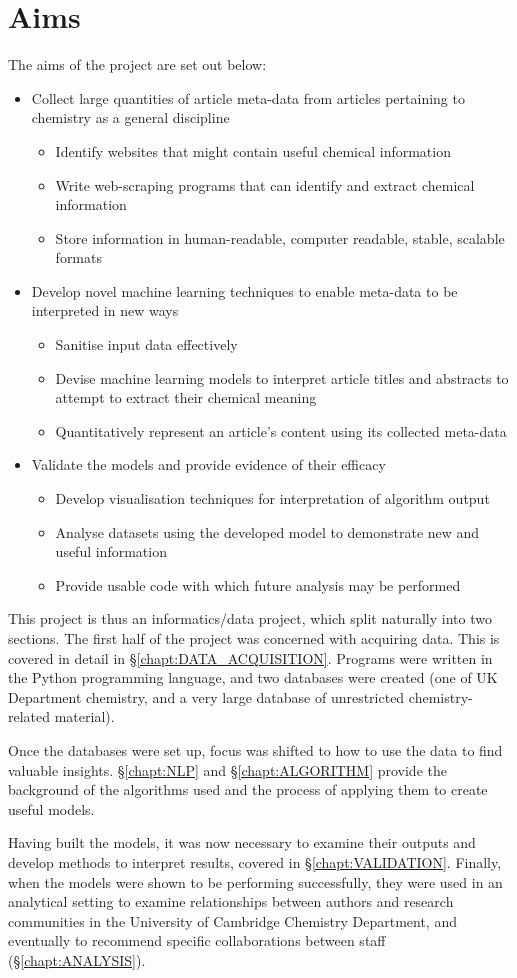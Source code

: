 \section{Aims}
The aims of the project are set out below:
\begin{itemize}
\item Collect large quantities of article meta-data from articles pertaining to chemistry as a general discipline
\begin{itemize}
\item Identify websites that might contain useful chemical information
\item Write web-scraping programs that can identify and extract chemical information
\item Store information in human-readable, computer readable, stable, scalable formats
\end{itemize}
\item Develop novel machine learning techniques to enable meta-data to be interpreted in new ways
\begin{itemize}
\itemsep0em 
\item Sanitise input data effectively
\item Devise  machine learning models to interpret article titles and abstracts to attempt to extract their chemical meaning
\item Quantitatively represent an article's content using its collected meta-data
\end{itemize}
\item Validate the models and provide evidence of their efficacy
\begin{itemize}
\item Develop visualisation techniques for interpretation of algorithm output
\item Analyse datasets using the developed model to demonstrate new and useful information
\item Provide usable code with which future analysis may be performed
\end{itemize}
\end{itemize}
This project is thus an informatics/data project, which split naturally into two sections. The first half of the project was concerned with acquiring data. This is covered in detail in \S\ref{chapt:DATA_ACQUISITION}.
Programs were written in the Python programming language, and two databases were created (one of UK Department chemistry, and a very large database of unrestricted chemistry-related material).

Once the databases were set up, focus was shifted to how to use the data to find valuable insights. \S\ref{chapt:NLP} and \S\ref{chapt:ALGORITHM} provide the background of the algorithms used and the process of applying them to create useful models. 

Having built the models, it was now necessary to examine their outputs and develop methods to interpret results, covered in \S\ref{chapt:VALIDATION}. Finally, when the models were shown to be performing successfully, they were used in an analytical setting to examine relationships between authors and research communities in the University of Cambridge Chemistry Department, and eventually to recommend specific collaborations between staff (\S\ref{chapt:ANALYSIS}).